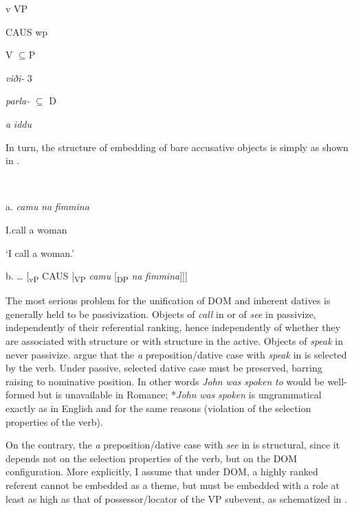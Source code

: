 \documentclass[output=paper]{langscibook}
\begin{document}
    v               VP    



     CAUS    wp



        V          ${\subseteq}$P



\textit{viði-}    3



        \textit{parla-}    ${\subseteq}$      D      


            \textit{a}      \textit{iddu}    

  In turn, the structure of embedding of bare accusative objects is simply as shown in . 

\ea\label{ex:key:}
{}\\
\z

a.  \textit{camu} \textit{na} \textit{fimmina}



  I.call a woman



  ‘I call a woman.’             


  b.  … [\textsubscript{vP} CAUS  [\textsubscript{VP} \textit{camu} [\textsubscript{DP} \textit{na} \textit{fimmina}]]]

The most serious problem for the unification of DOM and inherent datives is generally held to be passivization. Objects of \textit{call} in  or of \textit{see} in  passivize, independently of their referential ranking, hence independently of whether they are associated with structure  or with structure  in the active. Objects of \textit{speak} in  never passivize. \citet{ManziniFranco2016} argue that the \textit{a} preposition/dative case with \textit{speak} in  is selected by the verb. Under passive, selected dative case must be preserved, barring raising to nominative position. In other words \textit{John} \textit{was} \textit{spoken} \textit{to} would be well-formed but is unavailable in Romance; *\textit{John} \textit{was} \textit{spoken} is ungrammatical exactly as in English and for the same reasons (violation of the selection properties of the verb).

On the contrary, the \textit{a} preposition/dative case with \textit{see} in  is structural, since it depends not on the selection properties of the verb, but on the DOM configuration. More explicitly, I assume that under DOM, a highly ranked referent cannot be embedded as a theme, but must be embedded with a role at least as high as that of possessor/locator of the VP subevent, as schematized in . 
\end{document}
